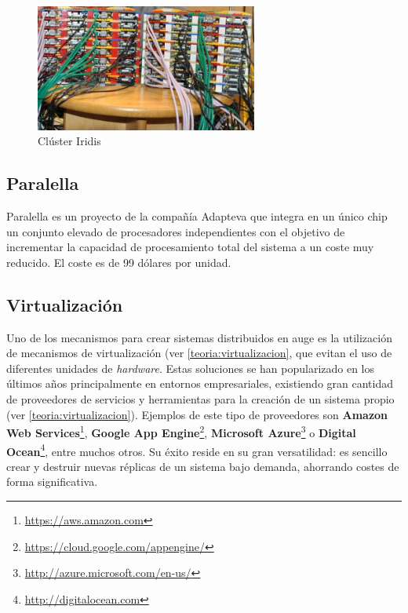 \begin{figure}[H]
  \centering
  \includegraphics[width=0.65\textwidth]{Chapters/Chapter3/Figures/iridis-pi.jpg}
  \caption[Iridis]{Clúster Iridis}
  \label{cox:iridis}
\end{figure}

\subsection{Paralella}

Paralella es un proyecto de la compañía Adapteva que integra en un único chip un conjunto elevado de procesadores independientes con el objetivo de incrementar la capacidad de procesamiento total del sistema a un coste muy reducido\cite{paralella}. El coste es de 99 dólares por unidad.

\subsection{Virtualización}

Uno de los mecanismos para crear sistemas distribuidos en auge es la utilización de mecanismos de virtualización (ver \ref{teoria:virtualizacion}, que evitan el uso de diferentes unidades de \textit{hardware}. Estas soluciones se han popularizado en los últimos años principalmente en entornos empresariales, existiendo gran cantidad de proveedores de servicios y herramientas para la creación de un sistema propio (ver \ref{teoria:virtualizacion}). Ejemplos de este tipo de proveedores son \textbf{Amazon Web Services}\footnote{\href{http://aws.amazon.com/}{https://aws.amazon.com}}, \textbf{Google App Engine}\footnote{\href{https://cloud.google.com/appengine/}{https://cloud.google.com/appengine/}}, \textbf{Microsoft Azure}\footnote{\href{http://azure.microsoft.com/}{http://azure.microsoft.com/en-us/}} o \textbf{Digital Ocean}\footnote{\href{http://digitalocean.com}{http://digitalocean.com}}, entre muchos otros. Su éxito reside en su gran versatilidad: es sencillo crear y destruir nuevas réplicas de un sistema bajo demanda, ahorrando costes de forma significativa.

